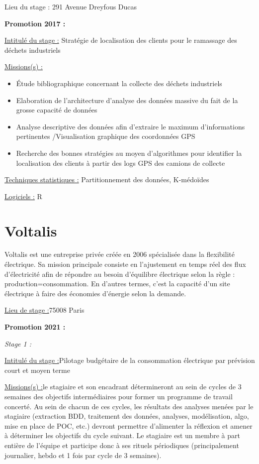 \documentclass[
  letterpaper,
  DIV=11,
  numbers=noendperiod]{scrreprt}
\begin{document}
Lieu du stage : 291 Avenue Dreyfous Ducas

\textbf{Promotion 2017 :}

\uline{Intitulé du stage :} Stratégie de localisation des clients pour
le ramassage des déchets industriels

\uline{Missions(s) :}

\begin{itemize}
\item
  Étude bibliographique concernant la collecte des déchets industriels
\item
  Elaboration de l'architecture d'analyse des données massive du fait de
  la grosse capacité de données
\item
  Analyse descriptive des données afin d'extraire le maximum
  d'informations pertinentes /Visualisation graphique des coordonnées
  GPS
\item
  Recherche des bonnes stratégies au moyen d'algorithmes pour identifier
  la localisation des clients à partir des logs GPS des camions de
  collecte
\end{itemize}

\uline{Techniques statistiques :} Partitionnement des données,
K-médoïdes

\uline{Logiciels :} R

\hypertarget{voltalis}{%
\section{\texorpdfstring{\textbf{Voltalis}}{Voltalis}}\label{voltalis}}

Voltalis est une entreprise privée créée en 2006 spécialisée dans la
flexibilité électrique. Sa mission principale consiste en l'ajustement
en temps réel des flux d'électricité afin de répondre au besoin
d'équilibre électrique selon la règle : production=consommation. En
d'autres termes, c'est la capacité d'un site électrique à faire des
économies d'énergie selon la demande.

\uline{Lieu de stage :}75008 Paris

\textbf{Promotion 2021 :}

\emph{Stage 1 :}

\uline{Intitulé du stage :}Pilotage budgétaire de la consommation
électrique par prévision court et moyen terme

\uline{Missions(s) :}le stagiaire et son encadrant détermineront au sein
de cycles de 3 semaines des objectifs intermédiaires pour former un
programme de travail concerté. Au sein de chacun de ces cycles, les
résultats des analyses menées par le stagiaire (extraction BDD,
traitement des données, analyses, modélisation, algo, mise en place de
POC, etc.) devront permettre d'alimenter la réflexion et amener à
déterminer les objectifs du cycle suivant. Le stagiaire est un membre à
part entière de l'équipe et participe donc à ses rituels périodiques
(principalement journalier, hebdo et 1 fois par cycle de 3 semaines).
\end{document}
